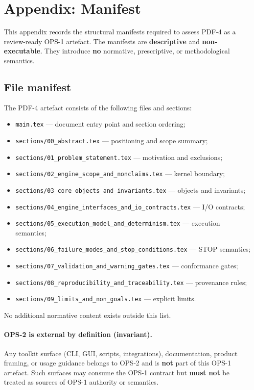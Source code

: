 ﻿\section{Appendix: Manifest}

This appendix records the structural manifests required to assess PDF-4
as a review-ready OPS-1 artefact.
The manifests are \textbf{descriptive} and \textbf{non-executable}.
They introduce \textbf{no} normative, prescriptive,
or methodological semantics.

\subsection{File manifest}

The PDF-4 artefact consists of the following files and sections:
\begin{itemize}
  \item \texttt{main.tex} — document entry point and section ordering;
  \item \texttt{sections/00\_abstract.tex} — positioning and scope summary;
  \item \texttt{sections/01\_problem\_statement.tex} — motivation and exclusions;
  \item \texttt{sections/02\_engine\_scope\_and\_nonclaims.tex} — kernel boundary;
  \item \texttt{sections/03\_core\_objects\_and\_invariants.tex} — objects and invariants;
  \item \texttt{sections/04\_engine\_interfaces\_and\_io\_contracts.tex} — I/O contracts;
  \item \texttt{sections/05\_execution\_model\_and\_determinism.tex} — execution semantics;
  \item \texttt{sections/06\_failure\_modes\_and\_stop\_conditions.tex} — STOP semantics;
  \item \texttt{sections/07\_validation\_and\_warning\_gates.tex} — conformance gates;
  \item \texttt{sections/08\_reproducibility\_and\_traceability.tex} — provenance rules;
  \item \texttt{sections/09\_limits\_and\_non\_goals.tex} — explicit limits.
\end{itemize}

No additional normative content exists outside this list.

\paragraph{OPS-2 is external by definition (invariant).}
Any toolkit surface (CLI, GUI, scripts, integrations),
documentation, product framing,
or usage guidance belongs to OPS-2
and is \textbf{not} part of this OPS-1 artefact.
Such surfaces may consume the OPS-1 contract
but \textbf{must not} be treated
as sources of OPS-1 authority or semantics.

